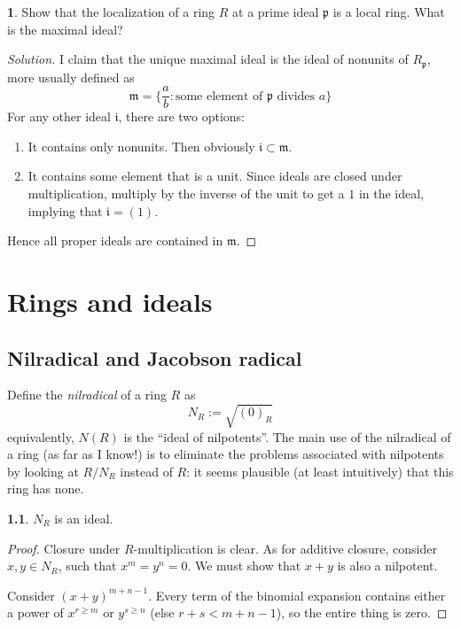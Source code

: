 \documentclass{book}
\newcommand{\fr}[1]{\mathfrak #1}
\theoremstyle{definition}
\theoremstyle{block}
\newtheorem{block}{}[section]
\newtheorem{block*}[block]{}
\theoremstyle{thm}
\begin{document}
\begin{block*}
  Show that the localization of a ring $R$ at a prime ideal $\fr p$ is a local
  ring. What is the maximal ideal?
\end{block*}
\begin{proof}[Solution]
  I claim that the unique maximal ideal is the ideal of nonunits of $R_{\fr p}$,
  more usually defined as
  \[
    \fr m = \{\frac a b : \text{some element of } \fr p \text { divides } a\}
  \]
  For any other ideal $\fr i$, there are two options:
  \begin{enumerate}[label=(\alph*)]
    \item It contains only nonunits. Then obviously $\fr i \subset \fr m$.
    \item It contains some element that is a unit. Since ideals are closed under
      multiplication, multiply by the inverse of the unit to get a $1$ in the
      ideal, implying that $\fr i = (1)$.
  \end{enumerate}
  Hence all proper ideals are contained in $\fr m$.
\end{proof}

\chapter{Rings and ideals}

\section{Nilradical and Jacobson radical}
Define the \textit{nilradical} of a ring $R$ as \[N_R:=\sqrt{(0)_R}\]
equivalently, $N(R)$ is the ``ideal of nilpotents''. The main use of the
nilradical of a ring (as far as I know!) is to eliminate the problems associated
with nilpotents by looking at $R/N_R$ instead of $R$: it seems plausible (at
least intuitively) that this ring has none.

\begin{block}
  $N_R$ is an ideal.
\end{block}
\begin{proof}
  Closure under $R$-multiplication is clear. As for additive closure, consider
  $x,y\in N_R$, such that $x^m = y^n = 0$. We must show that $x+y$ is also a
  nilpotent.\par
  Consider $(x+y)^{m+n-1}$. Every term of the binomial expansion contains either
  a power of $x^{r\geq m}$ or $y^{s\geq n}$ (else $r+s<m+n-1$), so the entire thing is zero.
\end{proof}
\end{document}
